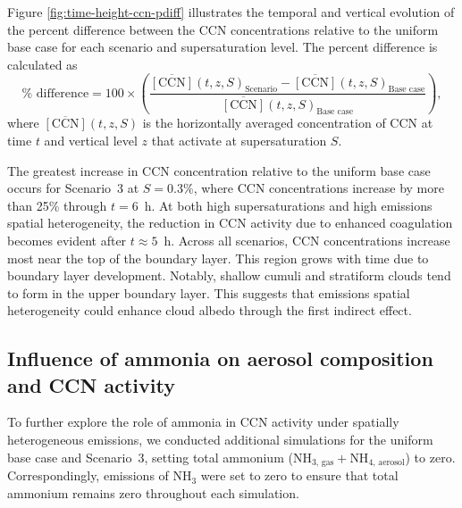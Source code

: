 \documentclass[journal abbreviation, manuscript]{copernicus}
\begin{document}
Figure \ref{fig:time-height-ccn-pdiff} illustrates the temporal and
vertical evolution of the percent difference between the CCN
concentrations relative to the uniform base case for each scenario and
supersaturation level. The percent difference is calculated as
\begin{equation}
    \% \text{ difference} = 100\times\left(\frac{\overline{[\text{CCN}]}(t, z, S)_{\text{Scenario}} - \overline{[\text{CCN}]}(t, z, S)_{\text{Base case}}}{\overline{[\text{CCN}]}(t, z, S)_{\text{Base case}}}\right),
\end{equation}
where $\overline{[\text{CCN}]}(t, z,S)$ is the horizontally averaged
concentration of CCN at time $t$ and vertical level $z$ that activate
at supersaturation $S$.

The greatest increase in CCN concentration relative to the uniform
base case occurs for Scenario~3 at $S=0.3\%$, where CCN concentrations
increase by more than 25\% through $t=6$~h. At both high
supersaturations and high emissions spatial heterogeneity, the
reduction in CCN activity due to enhanced coagulation becomes evident
after $t\approx5$~h.  Across all scenarios, CCN concentrations
increase most near the top of the boundary layer. This region grows
with time due to boundary layer development. Notably, shallow cumuli
and stratiform clouds tend to form in the upper boundary layer. This
suggests that emissions spatial heterogeneity could enhance cloud
albedo through the first indirect effect.



\subsection{Influence of ammonia on aerosol composition and CCN activity}\label{sec:influence-ammonia}

To further explore the role of ammonia in CCN activity under spatially
heterogeneous emissions, we conducted additional simulations for the
uniform base case and Scenario~3, setting total ammonium
(NH$_{3\text{, gas}} + $NH$_{4\text{, aerosol}}$) to zero. Correspondingly, 
emissions of NH$_3$ were set to zero to ensure that total ammonium remains
zero throughout each simulation.
\end{document}
